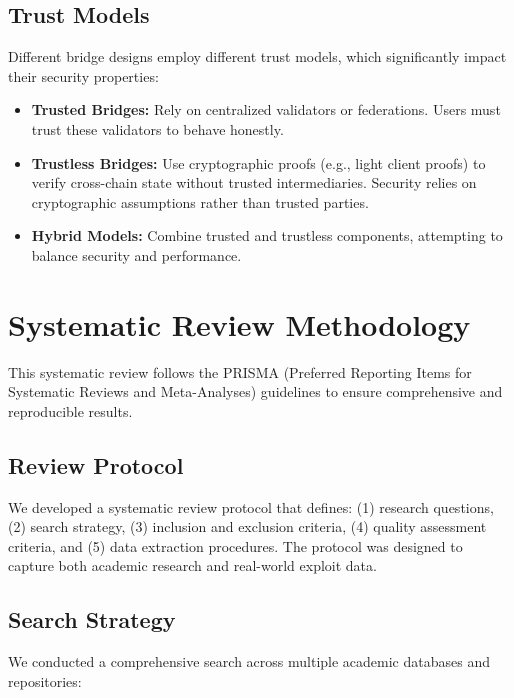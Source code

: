 \documentclass[runningheads]{llncs}
\begin{document}
\subsection{Trust Models}
Different bridge designs employ different trust models, which significantly impact their security properties:

\begin{itemize}
    \item \textbf{Trusted Bridges:} Rely on centralized validators or federations. Users must trust these validators to behave honestly.
    
    \item \textbf{Trustless Bridges:} Use cryptographic proofs (e.g., light client proofs) to verify cross-chain state without trusted intermediaries. Security relies on cryptographic assumptions rather than trusted parties.
    
    \item \textbf{Hybrid Models:} Combine trusted and trustless components, attempting to balance security and performance.
\end{itemize}

\vspace{-0.3cm}
\section{Systematic Review Methodology}
\label{sec:methodology}

This systematic review follows the PRISMA (Preferred Reporting Items for Systematic Reviews and Meta-Analyses) guidelines to ensure comprehensive and reproducible results.

\subsection{Review Protocol}
We developed a systematic review protocol that defines: (1) research questions, (2) search strategy, (3) inclusion and exclusion criteria, (4) quality assessment criteria, and (5) data extraction procedures. The protocol was designed to capture both academic research and real-world exploit data.

\subsection{Search Strategy}
We conducted a comprehensive search across multiple academic databases and repositories:
\end{document}

